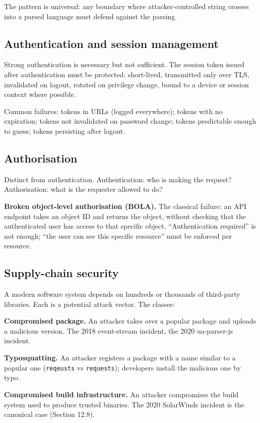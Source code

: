 The pattern is universal: any boundary where attacker-controlled string crosses into a parsed language must defend against the parsing.

\subsection{Authentication and session management}

Strong authentication is necessary but not sufficient. The session token issued after authentication must be protected: short-lived, transmitted only over TLS, invalidated on logout, rotated on privilege change, bound to a device or session context where possible.

Common failures: tokens in URLs (logged everywhere); tokens with no expiration; tokens not invalidated on password change; tokens predictable enough to guess; tokens persisting after logout.

\subsection{Authorisation}

Distinct from authentication. Authentication: who is making the request? Authorisation: what is the requester allowed to do?

\textbf{Broken object-level authorisation (BOLA).} The classical failure: an API endpoint takes an object ID and returns the object, without checking that the authenticated user has access to that specific object. ``Authentication required'' is not enough; ``the user can see this specific resource'' must be enforced per resource.

\subsection{Supply-chain security}

A modern software system depends on hundreds or thousands of third-party libraries. Each is a potential attack vector. The classes:

\textbf{Compromised package.} An attacker takes over a popular package and uploads a malicious version. The 2018 event-stream incident, the 2020 ua-parser-js incident.

\textbf{Typosquatting.} An attacker registers a package with a name similar to a popular one (\texttt{reqeusts} vs \texttt{requests}); developers install the malicious one by typo.

\textbf{Compromised build infrastructure.} An attacker compromises the build system used to produce trusted binaries. The 2020 SolarWinds incident is the canonical case (Section 12.8).

